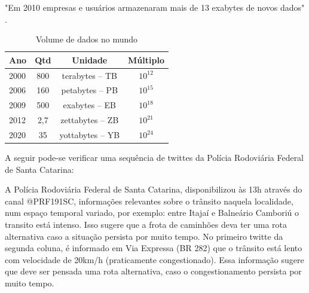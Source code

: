 "Em 2010 empresas e usuários armazenaram mais de 13 exabytes de novos dados" \cite{bigdataQualquerUm}.

\begin{table}[!ht]
\centering
\caption{Volume de dados no mundo}
\vspace{1mm}
\begin{tabular}{l|c|c|c}
\hline
\textbf{Ano} & \textbf{Qtd} & \textbf{Unidade} & \textbf{Múltiplo}\\
\hline
2000 & 800 & terabytes – TB & $10^{12}$\\
2006 & 160 & petabytes – PB & $10^{15}$\\
2009 & 500 & exabytes – EB & $10^{18}$ \\
2012 & 2,7 & zettabytes – ZB & $10^{21}$\\
2020 & 35 & yottabytes – YB & $10^{24}$\\
\end{tabular}
\end{table}



A seguir pode-se verificar uma sequência de twittes da Polícia Rodoviária Federal de Santa Catarina:

\begin{figure}[ht]
\quad \quad \quad \quad
{}
\end{figure}

A Polícia Rodoviária Federal de Santa Catarina, disponibilizou às 13h através do canal @PRF191SC, informações relevantes sobre o trânsito naquela localidade, 
num espaço temporal variado, por exemplo: entre Itajaí e Balneário Camboriú o transito está intenso. Isso sugere que a frota de caminhões deva ter uma
rota alternativa caso a situação persista por muito tempo. No primeiro twitte da segunda coluna, é informado em Via Expressa (BR 282) que o trânsito está lento com 
velocidade de 20km/h (praticamente congestionado). Essa informação sugere que deve ser pensada uma rota alternativa, caso o congestionamento persista por muito tempo.

